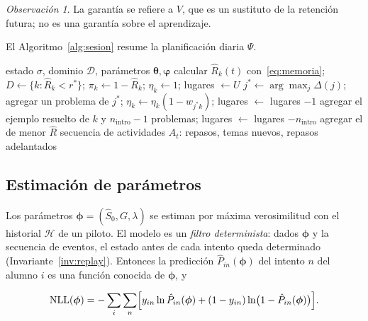 \documentclass[11pt]{article}
\theoremstyle{definition}
\theoremstyle{remark}
\newtheorem{observacion}{Observación}
\newcommand{\Rh}{\hat R}
\newcommand{\Sh}{\hat S}
\newcommand{\rstar}{r^{\ast}}
\newcommand{\Hist}{\mathcal H}
\newcommand{\Dom}{\mathcal D}
\begin{document}
\begin{observacion}
La garantía se refiere a $V$, que es un sustituto de la retención futura; no es una garantía sobre el aprendizaje.
\end{observacion}

El Algoritmo~\ref{alg:sesion} resume la planificación diaria $\Psi$.

\begin{algorithm}[t]
\caption{Planificación de la sesión del día $t$ ($\Psi$)}
\label{alg:sesion}
\small
\begin{algorithmic}[1]
\Require estado $\sigma$, dominio $\Dom$, parámetros $\bm\theta,\bm\varphi$
\State calcular $\Rh_k(t)$ con~\eqref{eq:memoria}; $D\gets\{k:\Rh_k<\rstar\}$; $\pi_k\gets1-\Rh_k$; $\eta_k\gets1$; lugares $\gets U$
 
  \State $j^\ast\gets\arg\max_j\Delta(j)$; agregar un problema de $j^\ast$; $\eta_k\gets\eta_k(1-w_{j^\ast k})$; lugares $\gets$ lugares $-1$
\EndWhile
{} 
  \State agregar el ejemplo resuelto de $k$ y $n_{\mathrm{intro}}-1$ problemas; lugares $\gets$ lugares $-n_{\mathrm{intro}}$
\EndWhile
{} 
  \State agregar el de menor $\Rh$
\EndWhile
\Ensure secuencia de actividades $A_t$: repasos, temas nuevos, repasos adelantados
\end{algorithmic}
\end{algorithm}

\subsection{Estimación de parámetros}
\label{sec:estimacion}

Los parámetros $\bm\phi=(\Sh_0,G,\lambda)$ se estiman por máxima verosimilitud con el historial $\Hist$ de un piloto. El modelo es un \emph{filtro determinista}: dados $\bm\phi$ y la secuencia de eventos, el estado antes de cada intento queda determinado (Invariante~\ref{inv:replay}). Entonces la predicción $\hat P_{in}(\bm\phi)$ del intento $n$ del alumno $i$ es una función conocida de $\bm\phi$, y

\begin{equation}
\mathrm{NLL}(\bm\phi)=-\sum_i\sum_n\Bigl[y_{in}\ln\hat P_{in}(\bm\phi)+(1-y_{in})\ln\bigl(1-\hat P_{in}(\bm\phi)\bigr)\Bigr].
\label{eq:nll}
\end{equation}
\end{document}
